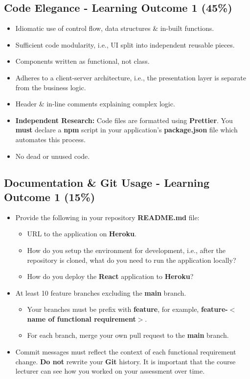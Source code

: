 \documentclass{article}
\begin{document}
\subsection*{Code Elegance - Learning Outcome 1 (45\%)}
\begin{itemize}
    \item Idiomatic use of control flow, data structures \& in-built functions.
    \item Sufficient code modularity, i.e., UI split into independent reusable pieces.
    \item Components written as functional, not class.
    \item Adheres to a client-server architecture, i.e., the presentation layer is separate from the business logic.
    \item Header \& in-line comments explaining complex logic.
    \item \textbf{Independent Research:} Code files are formatted using \textbf{Prettier}. You \textbf{must} declare a \textbf{npm} script in your application's \textbf{package.json} file which automates this process.
    \item No dead or unused code.
\end{itemize}

\subsection*{Documentation \& Git Usage - Learning Outcome 1 (15\%)}
\begin{itemize}
    \item Provide the following in your repository \textbf{README.md} file:
          \begin{itemize}
              \item URL to the application on \textbf{Heroku}.
              \item How do you setup the environment for development, i.e., after the repository is cloned, what do you need to run the application locally?
                    \item How do you deploy the \textbf{React} application to \textbf{Heroku}?
          \end{itemize}
            \end{itemize}
            \begin{itemize}
    \item At least 10 feature branches excluding the \textbf{main} branch.
    \begin{itemize}
            \item Your branches must be prefix with \textbf{feature}, for example, \textbf{feature-$<$name of functional requirement$>$}.
            \item For each branch, merge your own pull request to the \textbf{main} branch.
    \end{itemize}
    \item Commit messages must reflect the context of each functional requirement change. \textbf{Do not} rewrite your \textbf{Git} history. It is important that the course lecturer can see how you worked on your assessment over time.
\end{itemize}
\end{document}
